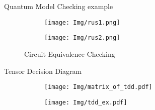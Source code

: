 \documentclass[aspectratio=1610]{beamer}
\begin{document}
\begin{frame}{Quantum Model Checking example}
    \begin{figure}
        \centering
        \begin{subfigure}{0.3\textwidth}
          \texttt{[image: Img/rus1.png]}
        \end{subfigure}
        \quad
        \begin{subfigure}{0.3\textwidth}
          \texttt{[image: Img/rus2.png]}
        \end{subfigure}
        \caption{ Circuit Equivalence Checking}
    \end{figure}
\end{frame}
\begin{frame}{Tensor Decision Diagram}
    \begin{figure}
        \begin{subfigure}{0.4\textwidth}
            \texttt{[image: Img/matrix\_of\_tdd.pdf]}
            \label{fig:mat_P}
        \end{subfigure}
        \qquad
        \qquad
        \qquad
        \begin{subfigure}[c]{0.4\textwidth}
            \centering
            \texttt{[image: Img/tdd\_ex.pdf]}
            \label{fig:tdd_P}
        \end{subfigure}
        \label{fig:P}
    \end{figure}
\end{frame}
\end{document}
